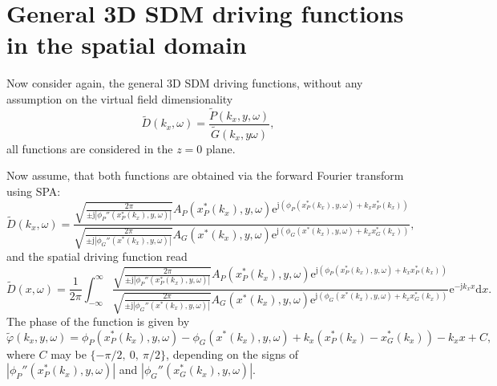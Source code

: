 \documentclass[12pt,a4paper]{article}
\newcommand{\td}{\mathrm{d}}
\newcommand{\te}{\mathrm{e}}
\newcommand{\ti}{\mathrm{j}}
\begin{document}
\section{General 3D SDM driving functions in the spatial domain}

Now consider again, the general 3D SDM driving functions, without any assumption on the virtual field dimensionality
\begin{equation}
\tilde{D}(k_x,\omega) = \frac{\tilde{P}(k_x,y,\omega)}{\tilde{G}(k_x,y\omega)},
\end{equation}
all functions are considered in the $z=0$ plane.

Now assume, that both functions are obtained via the forward Fourier transform using SPA:
\begin{equation}
\tilde{D}(k_x,\omega) = 
\frac{
\sqrt{\frac{2\pi}{\pm \ti \left|\phi_P''(x_P^*(k_x),y,\omega) \right|}} A_P(x_P^*(k_x),y,\omega) \te^{\ti (\phi_P(x_P^*(k_x),y,\omega)+k_x x_P^*(k_x)) }
}{
\sqrt{\frac{2\pi}{\pm \ti \left|\phi_G''(x^*(k_x),y,\omega) \right|}} A_G(x^*(k_x),y,\omega) \te^{\ti (\phi_G(x^*(k_x),y,\omega)+k_x x_G^*(k_x)) }
},
\end{equation}
and the spatial driving function read
\begin{equation}
\tilde{D}(x,\omega) = 
\frac{1}{2\pi}\int_{-\infty}^{\infty}
\frac{
\sqrt{\frac{2\pi}{\pm \ti \left|\phi_P''(x_P^*(k_x),y,\omega) \right|}} A_P(x_P^*(k_x),y,\omega) \te^{\ti (\phi_P(x_P^*(k_x),y,\omega)+k_x x_P^*(k_x)) }
}{
\sqrt{\frac{2\pi}{\pm \ti \left|\phi_G''(x^*(k_x),y,\omega) \right|}} A_G(x^*(k_x),y,\omega) \te^{\ti (\phi_G(x^*(k_x),y,\omega)+k_x x_G^*(k_x)) }
}
\te^{-\ti k_x x} \td x.
\end{equation}
The phase of the function is given by
\begin{equation}
\tilde{\varphi}(k_x,y,\omega) = \phi_P(x_P^*(k_x),y,\omega) - \phi_G(x^*(k_x),y,\omega)  + k_x \left( x_P^*(k_x) - x_G^*(k_x) \right) -  k_x x + C,
\end{equation}
where $C$ may be $\{-\pi/2,\ 0,\ \pi/2\}$, depending on the signs of $\left|\phi_P''(x_P^*(k_x),y,\omega) \right|$ and $\left|\phi_G''(x_G^*(k_x),y,\omega) \right|$.
\end{document}
